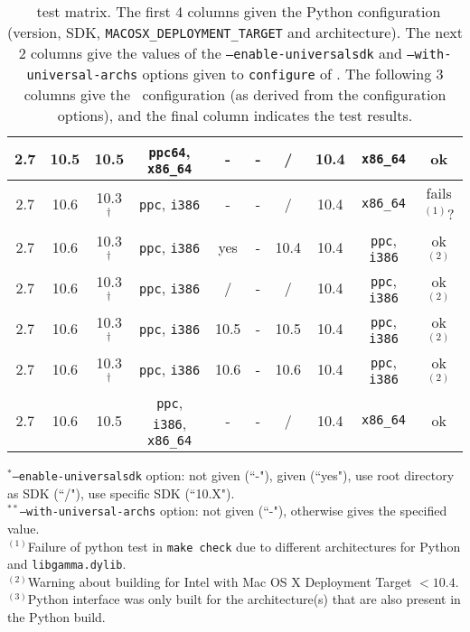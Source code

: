 \documentclass{article}[12pt,a4]
\begin{document}
\begin{table}[!t]
\begin{tabular}{cccc|cc|ccc|c}
  2.7 & 10.5 & 10.5 & {\tt ppc64}, {\tt x86\_64} & - & - & / & 10.4 & {\tt x86\_64} & ok \\
  \hline
  2.7 & 10.6 & 10.3$^\dag$ & {\tt ppc}, {\tt i386} & - & - & / & 10.4 & {\tt x86\_64} & fails$^{(1)}$? \\
  2.7 & 10.6 & 10.3$^\dag$ & {\tt ppc}, {\tt i386} & yes & - & 10.4 & 10.4 & {\tt ppc}, {\tt i386} & ok$^{(2)}$ \\
  2.7 & 10.6 & 10.3$^\dag$ & {\tt ppc}, {\tt i386} & / & - & / & 10.4 & {\tt ppc}, {\tt i386} & ok$^{(2)}$ \\
  2.7 & 10.6 & 10.3$^\dag$ & {\tt ppc}, {\tt i386} & 10.5 & - & 10.5 & 10.4 & {\tt ppc}, {\tt i386} & ok$^{(2)}$ \\
  2.7 & 10.6 & 10.3$^\dag$ & {\tt ppc}, {\tt i386} & 10.6 & - & 10.6 & 10.4 & {\tt ppc}, {\tt i386} & ok$^{(2)}$ \\
  \hline
  2.7 & 10.6 & 10.5 & {\tt ppc}, {\tt i386}, {\tt x86\_64} & - & - & / & 10.4 & {\tt x86\_64} & ok \\
  \hline
  \end{tabular}
  \begin{flushleft}
  $^\ast${\tt --enable-universalsdk} option: not given (``-"), given (``yes"), use root directory as SDK 
  (``/"), use specific SDK (``10.X"). \\
  $^{\ast\ast}${\tt --with-universal-archs} option: not given (``-"), otherwise gives the specified value. \\
  $^{(1)}$Failure of python test in {\tt make check} due to different architectures for 
  Python and {\tt libgamma.dylib}.\\
  $^{(2)}$Warning about building for Intel with Mac OS X Deployment Target $<10.4$. \\
  $^{(3)}$Python interface was only built for the architecture(s) that are also present in the
  Python build.
  \end{flushleft}
  \caption{\task\ test matrix. 
  The first 4 columns given the Python configuration 
  (version, SDK, {\tt MACOSX\_DEPLOYMENT\_TARGET} and architecture).
  The next 2 columns give the values of the {\tt --enable-universalsdk} and 
  {\tt --with-universal-archs} options given to {\tt configure} of \this.
  The following 3 columns give the \this\ configuration (as derived from the configuration
  options), and the final column indicates the test results.}
  \label{table:tests}
\end{table}
\end{document}
